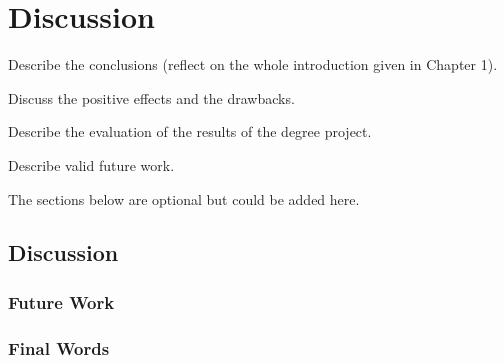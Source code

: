 \chapter{Discussion}
Describe the conclusions (reflect on the whole introduction given in Chapter 1). 

Discuss the positive effects and the drawbacks. 

Describe the evaluation of the results of the degree project.

Describe valid future work.  

The sections below are optional but could be added here.

\section{Discussion}

\subsection{Future Work}

\subsection{Final Words}







